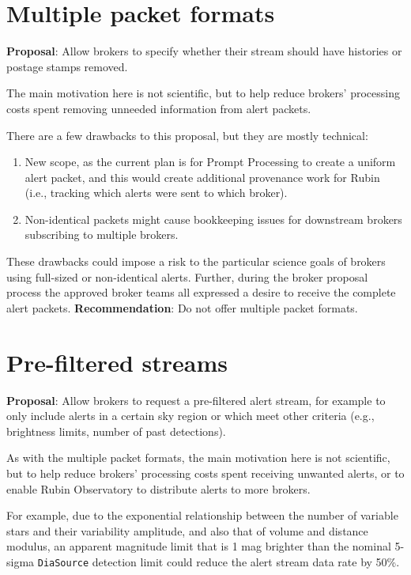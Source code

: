 \documentclass[DM,authoryear,toc]{lsstdoc}
\begin{document}
\section{Multiple packet formats}\label{sec:multiformats}

\textbf{Proposal}: Allow brokers to specify whether their stream should have histories or postage stamps removed.

The main motivation here is not scientific, but to help reduce brokers' processing costs spent removing unneeded information 
from alert packets. 

There are a few drawbacks to this proposal, but they are mostly technical:

\begin{enumerate}
\item New scope, as the current plan is for Prompt Processing to create a uniform alert packet, and this would create additional provenance work for Rubin (i.e., tracking which alerts were sent to which broker).
\item Non-identical packets might cause bookkeeping issues for downstream brokers subscribing to multiple brokers.
\end{enumerate}

These drawbacks could impose a risk to the particular science goals of brokers using full-sized or non-identical alerts.
Further, during the broker proposal process the approved broker teams all expressed a desire to receive the complete alert packets.
\textbf{Recommendation}: Do not offer multiple packet formats.


\section{Pre-filtered streams}\label{sec:prefilter}

\textbf{Proposal}: Allow brokers to request a pre-filtered alert stream, for example to only include alerts in a certain sky 
region or which meet other criteria (e.g., brightness limits, number of past detections).

As with the multiple packet formats, the main motivation here is not scientific, but to help reduce brokers' processing costs 
spent receiving unwanted alerts, or to enable Rubin Observatory to distribute alerts to more brokers.

For example, due to the exponential relationship between the number of variable stars and their variability amplitude, and 
also that of volume and distance modulus, an apparent magnitude limit that is 1 mag brighter than the nominal 5-sigma \texttt{DiaSource} 
detection limit could reduce the alert stream data rate by 50\%.
\end{document}
